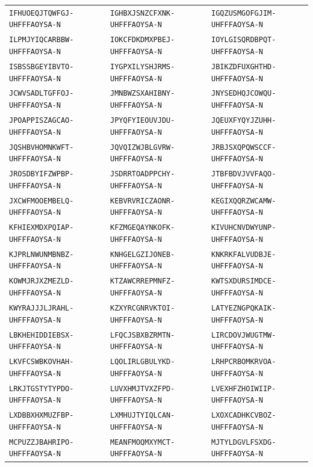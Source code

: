 {\begin{longtable}{@{}lll@{}}
\texttt{IFHUOEQJTQWFGJ-UHFFFAOYSA-N} & \texttt{IGHBXJSNZCFXNK-UHFFFAOYSA-N} & \texttt{IGQZUSMGOFGJIM-UHFFFAOYSA-N} \\
\texttt{ILPMJYIQCARBBW-UHFFFAOYSA-N} & \texttt{IOKCFDKDMXPBEJ-UHFFFAOYSA-N} & \texttt{IOYLGISQRDBPQT-UHFFFAOYSA-N} \\
\texttt{ISBSSBGEYIBVTO-UHFFFAOYSA-N} & \texttt{IYGPXILYSHJRMS-UHFFFAOYSA-N} & \texttt{JBIKZDFUXGHTHD-UHFFFAOYSA-N} \\
\texttt{JCWVSADLTGFFOJ-UHFFFAOYSA-N} & \texttt{JMNBWZSXAHIBNY-UHFFFAOYSA-N} & \texttt{JNYSEDHQJCOWQU-UHFFFAOYSA-N} \\
\texttt{JPOAPPISZAGCAO-UHFFFAOYSA-N} & \texttt{JPYQFYIEOUVJDU-UHFFFAOYSA-N} & \texttt{JQEUXFYQYJZUHH-UHFFFAOYSA-N} \\
\texttt{JQSHBVHOMNKWFT-UHFFFAOYSA-N} & \texttt{JQVQIZWJBLGVRW-UHFFFAOYSA-N} & \texttt{JRBJSXQPQWSCCF-UHFFFAOYSA-N} \\
\texttt{JROSDBYIFZWPBP-UHFFFAOYSA-N} & \texttt{JSDRRTOADPPCHY-UHFFFAOYSA-N} & \texttt{JTBFBDVJVVFAQO-UHFFFAOYSA-N} \\
\texttt{JXCWFMOOEMBELQ-UHFFFAOYSA-N} & \texttt{KEBVRVRICZAONR-UHFFFAOYSA-N} & \texttt{KEGIXQQRZWCAMW-UHFFFAOYSA-N} \\
\texttt{KFHIEXMDXPQIAP-UHFFFAOYSA-N} & \texttt{KFZMGEQAYNKOFK-UHFFFAOYSA-N} & \texttt{KIVUHCNVDWYUNP-UHFFFAOYSA-N} \\
\texttt{KJPRLNWUNMBNBZ-UHFFFAOYSA-N} & \texttt{KNHGELGZIJONEB-UHFFFAOYSA-N} & \texttt{KNKRKFALVUDBJE-UHFFFAOYSA-N} \\
\texttt{KOWMJRJXZMEZLD-UHFFFAOYSA-N} & \texttt{KTZAWCRREPMNFZ-UHFFFAOYSA-N} & \texttt{KWTSXDURSIMDCE-UHFFFAOYSA-N} \\
\texttt{KWYRAJJJLJRAHL-UHFFFAOYSA-N} & \texttt{KZXYRCGNRVKTOI-UHFFFAOYSA-N} & \texttt{LATYEZNGPQKAIK-UHFFFAOYSA-N} \\
\texttt{LBKHEHIDDIEBSX-UHFFFAOYSA-N} & \texttt{LFQCJSBXBZRMTN-UHFFFAOYSA-N} & \texttt{LIRCDOVJWUGTMW-UHFFFAOYSA-N} \\
\texttt{LKVFCSWBKOVHAH-UHFFFAOYSA-N} & \texttt{LQOLIRLGBULYKD-UHFFFAOYSA-N} & \texttt{LRHPCRBOMKRVOA-UHFFFAOYSA-N} \\
\texttt{LRKJTGSTYTYPDO-UHFFFAOYSA-N} & \texttt{LUVXHMJTVXZFPD-UHFFFAOYSA-N} & \texttt{LVEXHFZHOIWIIP-UHFFFAOYSA-N} \\
\texttt{LXDBBXHXMUZFBP-UHFFFAOYSA-N} & \texttt{LXMHUJTYIQLCAN-UHFFFAOYSA-N} & \texttt{LXOXCADHKCVBOZ-UHFFFAOYSA-N} \\
\texttt{MCPUZZJBAHRIPO-UHFFFAOYSA-N} & \texttt{MEANFMOQMXYMCT-UHFFFAOYSA-N} & \texttt{MJTYLDGVLFSXDG-UHFFFAOYSA-N} \\

\end{longtable}}

